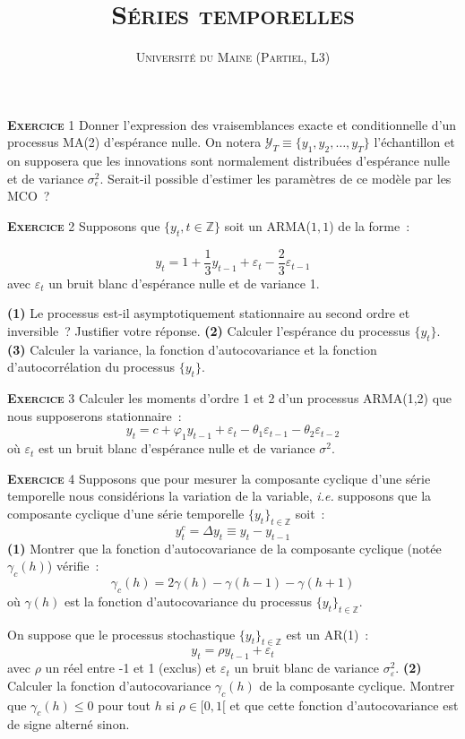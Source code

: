 \documentclass[10pt,a4paper,notitlepage,twocolumn]{article}
\newcommand{\exercice}[1]{\textsc{\textbf{Exercice}} #1}
\newcommand{\question}[1]{\textbf{(#1)}}
\begin{document}
\title{\textsc{Séries temporelles}}
\author{\textsc{Université du Maine (Partiel, L3)}}
\date{}

\maketitle

\exercice{1} Donner l'expression des vraisemblances exacte et
conditionnelle d'un processus MA(2) d'espérance nulle. On notera
$\mathcal Y_T \equiv \{y_1,y_2,\dots,y_T\}$ l'échantillon et on
supposera que les innovations sont normalement distribuées d'espérance
nulle et de variance $\sigma_{\epsilon}^2$. Serait-il possible
d'estimer les paramètres de ce modèle par les MCO ?

\bigskip
\bigskip

\exercice{2} Supposons que $\{y_t,t\in\mathbb Z\}$ soit un ARMA($1,1$) de la forme :

\[
y_t = 1 + \frac{1}{3}y_{t-1} + \varepsilon_t - \frac{2}{3} \varepsilon_{t-1}
\]
avec $\varepsilon_t$ un bruit blanc d'espérance nulle et de variance 1.\newline

\question{1} Le processus est-il asymptotiquement stationnaire au
second ordre et inversible~?  Justifier votre réponse. \question{2}
Calculer l'espérance du processus $\{y_t\}$. \question{3} Calculer la
variance, la fonction d'autocovariance et la fonction
d'autocorrélation du processus $\{y_t\}$.

\bigskip
\bigskip

\exercice{3} Calculer les moments d'ordre 1 et 2 d'un processus ARMA(1,2) que nous supposerons stationnaire :
\[
y_t = c + \varphi_1 y_{t-1} + \varepsilon_t - \theta_1 \varepsilon_{t-1} - \theta_2 \varepsilon_{t-2}
\]
où $\varepsilon_t$ est un bruit blanc d'espérance nulle et de variance $\sigma^2$.

\bigskip
\bigskip

\exercice{4} Supposons que pour mesurer la composante cyclique d'une
série temporelle nous considérions la variation de la variable,
\emph{i.e.} supposons que la composante cyclique d'une série temporelle $\{y_t\}_{t\in\mathbb Z}$ soit :
\[
y^c_t = \Delta y_t \equiv y_t-y_{t-1}
\]
\question{1} Montrer que la fonction d'autocovariance de la composante cyclique (notée $\gamma_c(h)$) vérifie :
\[
\gamma_c(h) = 2\gamma(h)-\gamma(h-1)-\gamma(h+1)
\]
où $\gamma(h)$ est la fonction d'autocovariance du processus
$\{y_t\}_{t\in\mathbb Z}$.\newline

On suppose que le processus
stochastique $\{y_t\}_{t\in\mathbb Z}$ est un AR(1) :
\[
y_t = \rho y_{t-1} + \varepsilon_t
\]
avec $\rho$ un réel entre -1 et 1 (exclus) et $\varepsilon_t$ un bruit blanc de variance $\sigma_{\varepsilon}^2$.
\question{2} Calculer la fonction d'autocovariance $\gamma_c(h)$ de la
composante cyclique. Montrer que $\gamma_c(h)\leq 0$ pour tout $h$ si
$\rho\in[0,1[$ et que cette fonction d'autocovariance est de signe
alterné sinon.
\end{document}
